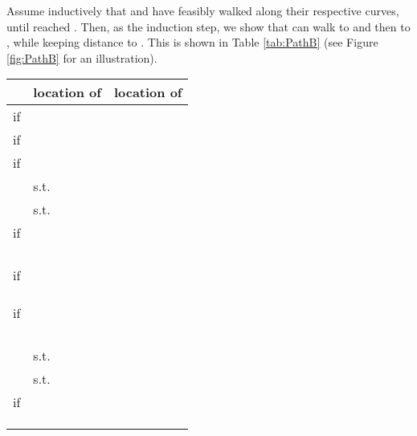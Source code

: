 \documentclass[12pt]{dalthesis}
\def\favoritefont{\bfseries \sffamily}
\def\QED{\ensuremath{{\Box}}}
\def\markatright#1{\leavevmode\unskip\nobreak\quad\hspace*{\fill}{#1}}
\newenvironment{proof}
	{\begin{trivlist}\item[\hskip\labelsep{\favoritefont Proof:}]}
	{\markatright{\QED}\end{trivlist}}
\begin{document}
\begin{proof}
Assume inductively that  and  have feasibly walked along 
their respective curves, until  reached .
Then, as the induction step, 
we 
show that
 can walk to  and then to  
, while keeping distance  to .
This is shown in Table \ref{tab:PathB}
 (see Figure \ref{fig:PathB} for an illustration). 


\begin{table}[h]
\centering
\begin{tabular}{ r | l | l  }
  & location of  & location of   
 \\
\hline
   if   &  &  \\
   if   &  & \\
   if   &  & \\

\hline
	&   s.t.   & \\
	&  	 s.t.   & \\

\hline
if  &  				   & \\
&  & \\
&  & \\

&   &  \\
&  & 
 \\




if  &  				   & \\

 &  &  \\
 &  &  \\


 &   &  \\






if  &  				   & \\
&  & \\
 & &  \\
 & &  \\
&   &  \\


\hline

	&   s.t.   & \\
	&  	 s.t.   & \\
\hline




if  &  		 		   & \\

 &  &  \\
 &  &  \\


 &   &  \\







\end{tabular}
\end{table}
\end{proof}
\end{document}
